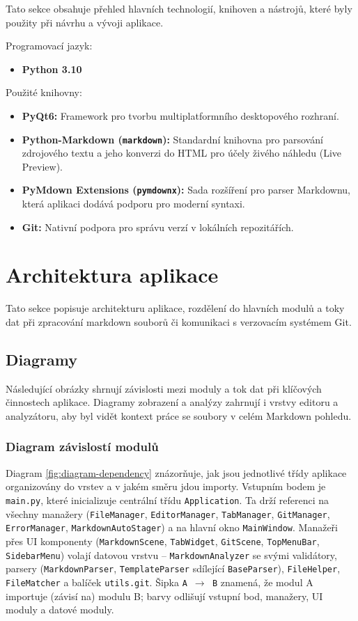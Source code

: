 \documentclass[12pt, a4paper]{article}
\begin{document}
Tato sekce obsahuje přehled hlavních technologií, knihoven a nástrojů, které byly použity při návrhu a vývoji aplikace.

Programovací jazyk:
\begin{itemize}
    \item \textbf{Python 3.10}
\end{itemize}

Použité knihovny:
\begin{itemize}
    \item \textbf{PyQt6:} Framework pro tvorbu multiplatformního desktopového rozhraní.
    \item \textbf{Python-Markdown (\texttt{markdown}):} Standardní knihovna pro parsování zdrojového textu a jeho konverzi do HTML pro účely živého náhledu (Live Preview).
    \item \textbf{PyMdown Extensions (\texttt{pymdownx}):} Sada rozšíření pro parser Markdownu, která aplikaci dodává podporu pro moderní syntaxi.
    \item \textbf{Git:} Nativní podpora pro správu verzí v lokálních repozitářích.
\end{itemize}

\section{Architektura aplikace}

Tato sekce popisuje architekturu aplikace, rozdělení do hlavních modulů a 
toky dat při zpracování markdown souborů či komunikaci s verzovacím systémem Git.

\subsection{Diagramy}

Následující obrázky shrnují závislosti mezi moduly a tok dat při klíčových činnostech aplikace.
Diagramy zobrazení a analýzy zahrnují i vrstvy editoru a analyzátoru, aby byl vidět kontext práce se soubory
v celém Markdown pohledu.

\subsubsection*{Diagram závislostí modulů}

Diagram \ref{fig:diagram-dependency} znázorňuje, jak jsou jednotlivé třídy aplikace
organizovány do vrstev a v jakém směru jdou importy. Vstupním bodem je \texttt{main.py},
které inicializuje centrální třídu \texttt{Application}. Ta drží referenci na všechny
manažery (\texttt{FileManager}, \texttt{EditorManager}, \texttt{TabManager},
\texttt{GitManager}, \texttt{ErrorManager}, \texttt{MarkdownAutoStager}) a na hlavní okno
\texttt{MainWindow}. Manažeři přes UI komponenty (\texttt{MarkdownScene}, \texttt{TabWidget},
\texttt{GitScene}, \texttt{TopMenuBar}, \texttt{SidebarMenu}) volají datovou vrstvu --
\texttt{MarkdownAnalyzer} se svými validátory, parsery (\texttt{MarkdownParser},
\texttt{TemplateParser} sdílející \texttt{BaseParser}), \texttt{FileHelper},
\texttt{FileMatcher} a balíček \texttt{utils.git}. Šipka \texttt{A $\rightarrow$ B} znamená,
že modul A importuje (závisí na) modulu B; barvy odlišují vstupní bod, manažery, UI moduly
a datové moduly.
\end{document}

